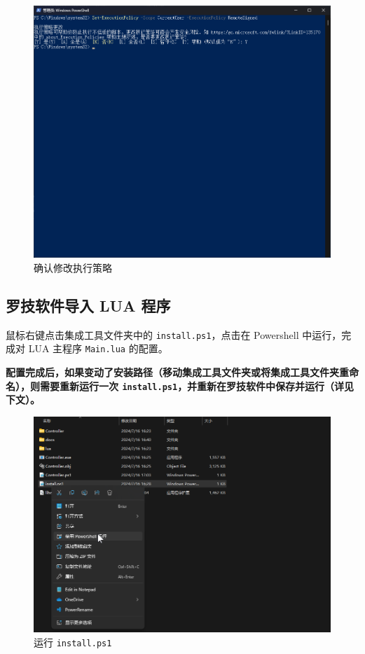\begin{figure}[H]
    \Centering
    \includegraphics[width=\textwidth]{docs/assets/confirm_execution_policy_01.png}
    \caption{确认修改执行策略}
\end{figure}

\subsection{罗技软件导入 LUA 程序}

鼠标右键点击集成工具文件夹中的 \lstinline{install.ps1}，点击在 Powershell 中运行，完成对 LUA 主程序 \lstinline{Main.lua} 的配置。

\textbf{\color{red}配置完成后，如果变动了安装路径（移动集成工具文件夹或将集成工具文件夹重命名），则需要重新运行一次 \lstinline{install.ps1}，并重新在罗技软件中保存并运行（详见下文）。}

\begin{figure}[H]
    \Centering
    \includegraphics[width=\textwidth]{docs/assets/install.png}
    \caption{运行 \lstinline{install.ps1}}
\end{figure}

